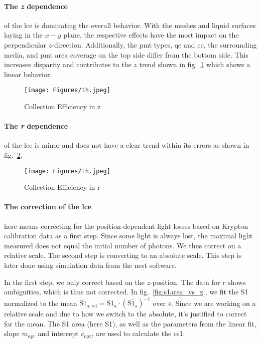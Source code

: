 \paragraph{The \emph{z} dependence} of the \gls{lce} is dominating the overall behavior.
With the meshes and liquid surfaces laying in the $ x-y $ plane, the respective effects have the most impact on the perpendicular $ z $-direction.
Additionally, the \gls{pmt} types, \gls{qe} and \gls{ce}, the surrounding media, and \gls{pmt} area coverage on the top side differ from the bottom side.
This increases disparity and contributes to the $ z $ trend shown in fig.~\ref{fig:ce_vs_z} which shows a linear behavior.


\begin{figure}
\centering
\texttt{[image: Figures/th.jpeg]}  %
\caption[Collection Efficiency in z]{
        Collection Efficiency in z
    }
\label{fig:ce_vs_z}
\end{figure}

\paragraph{The \emph{r} dependence} of the \gls{lce} is minor and does not have a clear trend within its errors as shown in fig.~\ref{fig:ce_vs_r}.

\begin{figure}
\centering
    \texttt{[image: Figures/th.jpeg]}  %
\caption[Collection Efficiency in r]{
    Collection Efficiency in r
    }
\label{fig:ce_vs_r}
\end{figure}

\paragraph{The correction of the \gls{lce}} here means correcting for the position-dependent light losses based on Krypton calibration data as a first step.
Since some light is always lost, the maximal light measured does not equal the initial number of photons.
We thus correct on a relative scale.
The second step is converting to an absolute scale.
This step is later done using simulation data from the \gls{nest} software.  %

In the first step, we only correct based on the $ z $-position.
The data for $ r $ shows ambiguities, which is thus not corrected.
In fig.~\ref{fig:s1area_vs_z}, we fit the S1 normalized to the mean $ \mathrm{S1_{a,rel}} = \mathrm{S1_a} \cdot \left( \overline{\mathrm{S1_a}} \right)^{-1} $ over $ z $.  %
Since we are working on a relative scale and due to how we switch to the absolute, it's justified to correct for the mean.
The S1 area (here S1), as well as the parameters from the linear fit, slope $ m_\mathrm{opt} $ and intercept $ c_\mathrm{opt} $, are used to calculate the \gls{cs1}:

